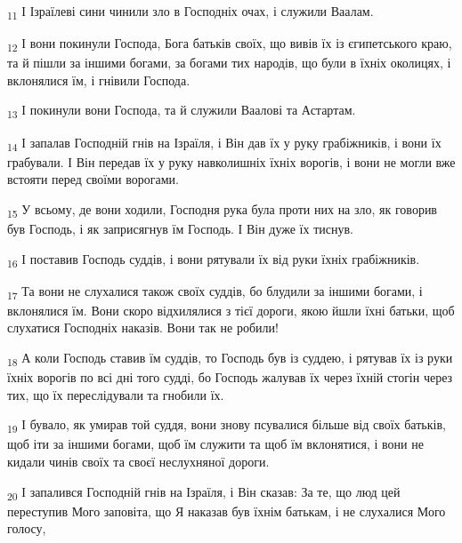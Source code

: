 \begin{tcolorbox}
\textsubscript{11} І Ізраїлеві сини чинили зло в Господніх очах, і служили Ваалам.
\end{tcolorbox}
\begin{tcolorbox}
\textsubscript{12} І вони покинули Господа, Бога батьків своїх, що вивів їх із єгипетського краю, та й пішли за іншими богами, за богами тих народів, що були в їхніх околицях, і вклонялися їм, і гнівили Господа.
\end{tcolorbox}
\begin{tcolorbox}
\textsubscript{13} І покинули вони Господа, та й служили Ваалові та Астартам.
\end{tcolorbox}
\begin{tcolorbox}
\textsubscript{14} І запалав Господній гнів на Ізраїля, і Він дав їх у руку грабіжників, і вони їх грабували. І Він передав їх у руку навколишніх їхніх ворогів, і вони не могли вже встояти перед своїми ворогами.
\end{tcolorbox}
\begin{tcolorbox}
\textsubscript{15} У всьому, де вони ходили, Господня рука була проти них на зло, як говорив був Господь, і як заприсягнув їм Господь. І Він дуже їх тиснув.
\end{tcolorbox}
\begin{tcolorbox}
\textsubscript{16} І поставив Господь суддів, і вони рятували їх від руки їхніх грабіжників.
\end{tcolorbox}
\begin{tcolorbox}
\textsubscript{17} Та вони не слухалися також своїх суддів, бо блудили за іншими богами, і вклонялися їм. Вони скоро відхилялися з тієї дороги, якою йшли їхні батьки, щоб слухатися Господніх наказів. Вони так не робили!
\end{tcolorbox}
\begin{tcolorbox}
\textsubscript{18} А коли Господь ставив їм суддів, то Господь був із суддею, і рятував їх із руки їхніх ворогів по всі дні того судді, бо Господь жалував їх через їхній стогін через тих, що їх переслідували та гнобили їх.
\end{tcolorbox}
\begin{tcolorbox}
\textsubscript{19} І бувало, як умирав той суддя, вони знову псувалися більше від своїх батьків, щоб іти за іншими богами, щоб їм служити та щоб їм вклонятися, і вони не кидали чинів своїх та своєї неслухняної дороги.
\end{tcolorbox}
\begin{tcolorbox}
\textsubscript{20} І запалився Господній гнів на Ізраїля, і Він сказав: За те, що люд цей переступив Мого заповіта, що Я наказав був їхнім батькам, і не слухалися Мого голосу,
\end{tcolorbox}
